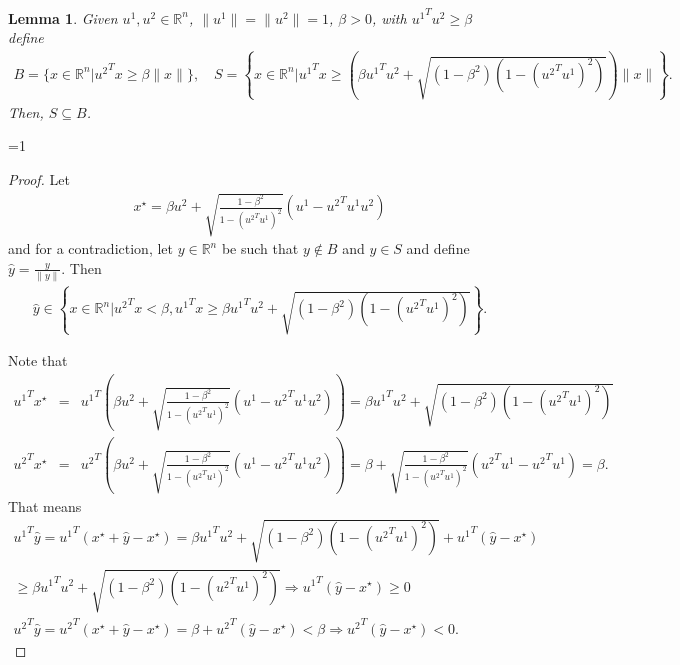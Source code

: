 \documentclass{article}
\newtheorem{lemma}[theorem]{Lemma}
\theoremstyle{case}
\newcommand{\rn}{{\mathbb R^{n}}}
\def\includeproofs{1}
\begin{document}
\begin{lemma}
\label{cone_subset_cone}
Given $u^1, u^2 \in \rn$, $\|u^1\| = \|u^2\|= 1$, $\beta >0$, with ${u^1}^Tu^2 \ge \beta$ define
\begin{align*}
B = \{x\in\rn | {u^2}^Tx \ge \beta\|x\|\}, \quad
S = \left\{x\in\rn \bigg| {u^1}^Tx \ge \left(\beta {u^1}^Tu^2 + \sqrt{(1 - \beta^2)\left(1 - ({u^2}^Tu^1)^2\right)}\right)\|x\| \right\}. 
\end{align*}
Then, $S \subseteq B$.
\end{lemma}


\ifnum\includeproofs=1
\begin{proof}
Let 
\begin{align*}
x^{\star} = \beta u^2 + \sqrt{\frac{1 - \beta^2}{1 - ({u^2}^Tu^1)^2}} (u^1 - {u^2}^Tu^1 u^2 )
\end{align*} and for a contradiction, let $y \in \rn$ be such that $y \not \in B$ and $y \in S$ and define $\hat y = \frac{y}{\|y\|}$.
Then
\begin{align*}
\hat y \in \left\{x \in \rn | {u^2}^Tx < \beta, {u^1}^Tx \ge \beta {u^1}^Tu^2 + \sqrt{(1 - \beta^2)\left(1 - ({u^2}^Tu^1)^2\right)} \right\}.
\end{align*}

Note that
\begin{align}
{u^1}^Tx^{\star} &=& {u^1}^T\left(\beta u^2 + \sqrt{\frac{1 - \beta^2}{1 - ({u^2}^Tu^1)^2}} (u^1 - {u^2}^Tu^1 u^2 )\right) = 
\beta {u^1}^Tu^2 + \sqrt{(1 - \beta^2)\left(1 - ({u^2}^Tu^1)^2\right)} \\
{u^2}^Tx^{\star} &=& {u^2}^T\left(\beta u^2 + \sqrt{\frac{1 - \beta^2}{1 - ({u^2}^Tu^1)^2}} (u^1 - {u^2}^Tu^1 u^2 )\right) = 
\beta + \sqrt{\frac{1 - \beta^2}{1 - ({u^2}^Tu^1)^2}} ({u^2}^Tu^1 - {u^2}^Tu^1 ) = \beta.
\end{align}
That means
\begin{align}
{u^1}^T\hat y = {u^1}^T\left(x^{\star} + \hat y - x^{\star}\right) = \beta {u^1}^Tu^2 + \sqrt{(1 - \beta^2)\left(1 - ({u^2}^Tu^1)^2\right)} + {u^1}^T\left(\hat y - x^{\star}\right) \\
\ge \beta {u^1}^Tu^2 + \sqrt{(1 - \beta^2)\left(1 - ({u^2}^Tu^1)^2\right)} 
\Longrightarrow {u^1}^T\left(\hat y - x^{\star}\right) \ge 0 \\
{u^2}^T\hat y = {u^2}^T\left(x^{\star} + \hat y - x^{\star}\right) = \beta + {u^2}^T\left(\hat y - x^{\star}\right) < \beta
\Longrightarrow {u^2}^T\left(\hat y - x^{\star}\right) < 0. \label{the_difference_is_nonzero}
\end{align}


\end{proof}
\end{document}
